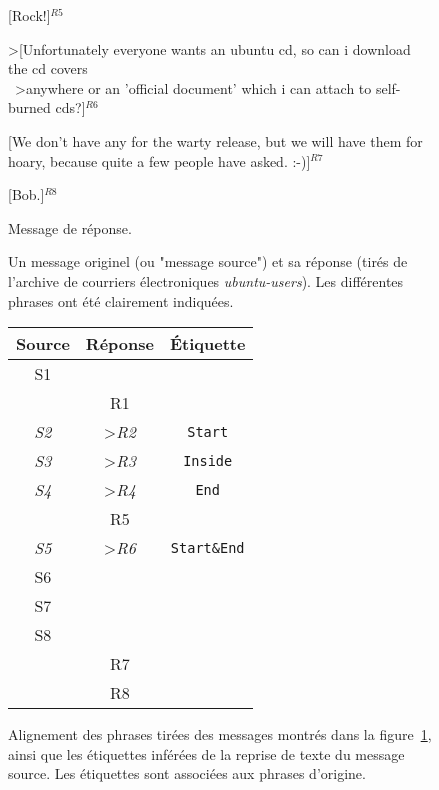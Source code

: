\begin{figure}
\begin{minipage}{\textwidth}
{{                [Rock!]$^{R5}$\vspace{0.3cm}

                \textgreater [Unfortunately everyone wants an ubuntu cd, so can i download the cd covers \\ \ 
                \textgreater anywhere or an 'official document' which i can attach to self-burned cds?]$^{R6}$\vspace{0.3cm}

                [We don't have any for the warty release, but we will have them for hoary, %
                because quite a few people have asked. :-)]$^{R7}$\vspace{0.3cm}

                [Bob.]$^{R8}$ %
                \vspace{3mm}
            }
        }
        
        \begin{center}
        Message de réponse.
        \end{center}
    \end{minipage}

    \caption{Un message originel (ou "message source") et sa réponse (tirés de l'archive de courriers électroniques \textit{ubuntu-users}). Les différentes phrases ont été clairement indiquées.}
    \label{fig:exampleSourceReplyMessage}
\end{figure}

\begin{figure}
    \small\centering
    \begin{tabular}{|*{2}{c}c|}
    \toprule
    \textbf{Source} & \textbf{Réponse} & \textbf{Étiquette} \\
        \midrule
        S1  & & \\
        & R1 & \\
        \textit{S2}  & \textgreater \textit{R2}& \texttt{Start} \\
        \textit{S3}  & \textgreater \textit{R3}& \texttt{Inside} \\
        \textit{S4}  & \textgreater \textit{R4}& \texttt{End} \\
        & R5 & \\
        \textit{S5}  & \textgreater \textit{R6} & \texttt{Start\&End} \\
        S6 &  & \\ 
        S7 &  & \\
        S8 &  & \\
        & R7 & \\
        & R8 & \\
        \bottomrule
    \end{tabular}

    \caption{Alignement des phrases tirées des messages montrés dans la figure~\ref{fig:exampleSourceReplyMessage}, ainsi que les étiquettes inférées de la reprise de texte du message source. Les étiquettes sont associées aux phrases d'origine.}
    \label{fig:exampleSegmentationLabels}
\end{figure}


